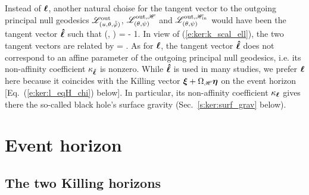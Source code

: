 \begin{remark}
Instead of $\bm{\ell}$, another natural choise for the tangent vector to the outgoing
principal null geodesics $\mathscr{L}^{\rm out}_{(u,\theta,\tilde{{\tilde\varphi}})}$,
$\mathscr{L}^{{\rm out},\mathscr{H}}_{(\theta,\psi)}$ and $\mathscr{L}^{{\rm out},\mathscr{H}_{\rm in}}_{(\theta,\psi)}$
would have been the tangent vector $\bm{\hat{\ell}}$
such that
\be
    (, \w{\hat{\el}}) = - 1.
\ee
In view of (\ref{e:ker:k_scal_ell}), the two tangent vectors are related by
\be
    \w{\hat{\el}} =  \wl .
\ee
As for $\bm{\ell}$, the tangent vector $\bm{\hat{\ell}}$ does not correspond to
an affine parameter of the outgoing
principal null geodesics, i.e. its
non-affinity coefficient $\kappa_{\bm{\hat{\ell}}}$ is nonzero. While
$\bm{\hat{\ell}}$ is used in many studies, we prefer $\bm{\ell}$ here because it
coincides with the Killing vector $\bm{\xi} + \Omega_{\mathscr{H}} \bm{\eta}$
on the event horizon [Eq.~(\ref{e:ker:l_eqH_chi}) below]. In particular, its
non-affinity coefficient $\kappa_{\bm{\ell}}$ gives there the so-called
black hole's surface gravity (Sec.~\ref{s:ker:surf_grav} below).
\end{remark}






\section{Event horizon} \label{s:ker:event_hor_gen}

\subsection{The two Killing horizons} \label{s:ker:Killing_hor}

